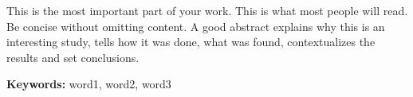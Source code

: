 \noindent
This is the most important part of your work.
This is what most people will read.
Be concise without omitting content.
A good abstract explains why this is an interesting study, tells how it was done, what was found, contextualizes the results and set conclusions.
\par
\vspace{1em}
\noindent\textbf{Keywords:} word1, word2, word3


\newpage

\listoffigures

\listoftables

\printnomenclature

\tableofcontents
